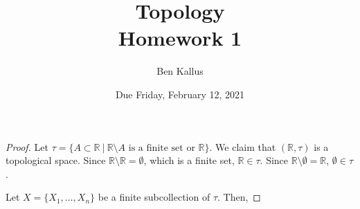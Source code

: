\documentclass{article}
\date{Due Friday, February 12, 2021}
\author{Ben Kallus}
\title{Topology \\ Homework 1}
\newcommand{\R}{\mathbb R}
\begin{document}
\pagecolor{black}
\color{white}
\maketitle

\begin{proof}
    Let $\tau = \{A \subset \R~|~\R \setminus A \text{ is a finite set or } \R\}$.
    We claim that $(\R, \tau)$ is a topological space.
    Since $\R \setminus \R = \emptyset$, which is a finite set, $\R \in \tau$.
    Since $\R \setminus \emptyset = \R$, $\emptyset \in \tau$.

    Let $X = \{X_1, \hdots, X_n\}$ be a finite subcollection of $\tau$.
    Then, 
\end{proof}
\end{document}
